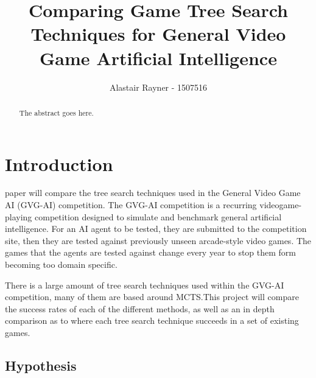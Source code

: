 \documentclass[journal]{IEEEtran}
\begin{document}
%
\title{Comparing Game Tree Search Techniques for General Video Game Artificial Intelligence}
%
%
\author{Alastair Rayner - 1507516}


\maketitle

\begin{abstract}
The abstract goes here.
\end{abstract}

\section{Introduction}
 paper will compare the tree search techniques used in the General Video Game AI (GVG-AI) competition. 
The GVG-AI competition is a recurring videogame-playing competition designed to simulate and benchmark general artificial intelligence. For an AI agent to be tested, they are submitted to the competition site, then they are tested against previously unseen arcade-style video games. The games that the agents are tested against change every year to stop them form becoming too domain specific.

There is a large amount of tree search techniques used within the GVG-AI competition, many of them are based around MCTS.This project will compare the success rates of each of the different methods, as well as an in depth comparison as to where each tree search technique succeeds in a set of existing games.

\subsection{Hypothesis}
\end{document}
